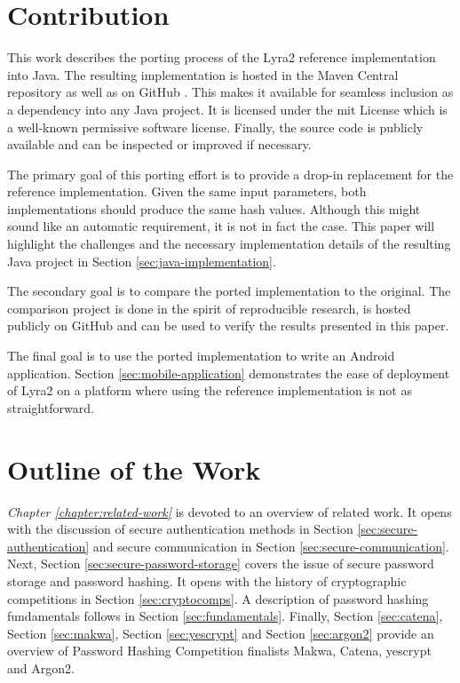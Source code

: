 \section{Contribution}
This work describes the porting process of the Lyra2 reference implementation into Java. The resulting implementation is hosted in the Maven Central repository \cite{maven:2017:lyra2} as well as on GitHub \cite{github:2017:lyra2-java}. This makes it available for seamless inclusion as a dependency into any Java project. It is licensed under the \gls{mit} License which is a well-known permissive software license. Finally, the source code is publicly available and can be inspected or improved if necessary.

The primary goal of this porting effort is to provide a drop-in replacement for the reference implementation. Given the same input parameters, both implementations should produce the same hash values. Although this might sound like an automatic requirement, it is not in fact the case. This paper will highlight the challenges and the necessary implementation details of the resulting Java project in Section \ref{sec:java-implementation}.

The secondary goal is to compare the ported implementation to the original. The comparison project is done in the spirit of reproducible research, is hosted publicly on GitHub \cite{github:2017:lyra2-compare} and can be used to verify the results presented in this paper.

The final goal is to use the ported implementation to write an Android application. Section \ref{sec:mobile-application} demonstrates the ease of deployment of Lyra2 on a platform where using the reference implementation is not as straightforward.

\section{Outline of the Work}

\emph{Chapter \ref{chapter:related-work}} is devoted to an overview of related work. It opens with the discussion of secure authentication methods in Section \ref{sec:secure-authentication} and secure communication in Section \ref{sec:secure-communication}. Next, Section \ref{sec:secure-password-storage} covers the issue of secure password storage and password hashing. It opens with the history of cryptographic competitions in Section \ref{sec:cryptocomps}. A description of password hashing fundamentals follows in Section \ref{sec:fundamentals}. Finally, Section \ref{sec:catena}, Section \ref{sec:makwa}, Section \ref{sec:yescrypt} and Section \ref{sec:argon2} provide an overview of Password Hashing Competition finalists Makwa, Catena, yescrypt and Argon2.

